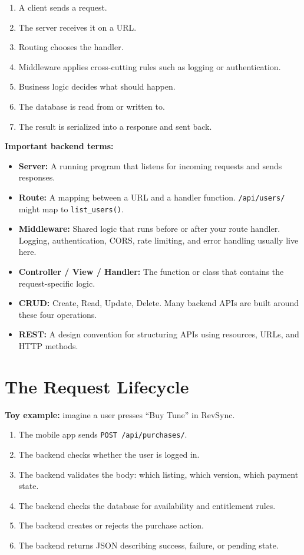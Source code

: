 \documentclass[12pt, a4paper, oneside]{book}
\begin{document}
\begin{enumerate}[leftmargin=2em]
    \item A client sends a request.
    \item The server receives it on a URL.
    \item Routing chooses the handler.
    \item Middleware applies cross-cutting rules such as logging or authentication.
    \item Business logic decides what should happen.
    \item The database is read from or written to.
    \item The result is serialized into a response and sent back.
\end{enumerate}

\textbf{Important backend terms:}
\begin{itemize}[leftmargin=2em]
    \item \textbf{Server:} A running program that listens for incoming requests and sends responses.
    \item \textbf{Route:} A mapping between a URL and a handler function. \texttt{/api/users/} might map to \texttt{list\_users()}.
    \item \textbf{Middleware:} Shared logic that runs before or after your route handler. Logging, authentication, CORS, rate limiting, and error handling usually live here.
    \item \textbf{Controller / View / Handler:} The function or class that contains the request-specific logic.
    \item \textbf{CRUD:} Create, Read, Update, Delete. Many backend APIs are built around these four operations.
    \item \textbf{REST:} A design convention for structuring APIs using resources, URLs, and HTTP methods.
\end{itemize}

\section{The Request Lifecycle}

\textbf{Toy example:} imagine a user presses ``Buy Tune'' in RevSync.

\begin{enumerate}[leftmargin=2em]
    \item The mobile app sends \texttt{POST /api/purchases/}.
    \item The backend checks whether the user is logged in.
    \item The backend validates the body: which listing, which version, which payment state.
    \item The backend checks the database for availability and entitlement rules.
    \item The backend creates or rejects the purchase action.
    \item The backend returns JSON describing success, failure, or pending state.
\end{enumerate}
\end{document}
